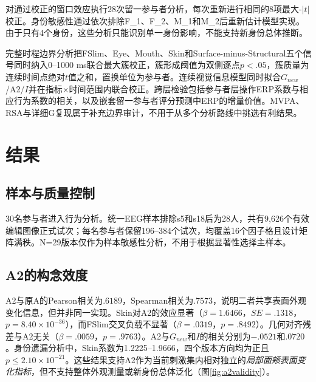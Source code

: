 \documentclass[preprint,12pt,authoryear]{elsarticle}
\begin{document}
对通过校正的窗口效应执行28次留一参与者分析，每次重新进行相同的8项最大-$|t|$校正。身份敏感性通过依次排除F\_1、F\_2、M\_1和M\_2后重新估计模型实现。由于只有4个身份，这些分析只能识别单一身份影响，不能支持新身份总体推断。

完整时程边界分析把FSlim、Eye、Mouth、Skin和Surface-minus-Structural五个信号同时纳入0--1000 ms联合最大簇校正，簇形成阈值为双侧逐点$p<.05$，簇质量为连续时间点绝对$t$值之和，置换单位为参与者。连续视觉信息模型同时拟合$G_{new}$/A2/$I$并在指标$\times$时间范围内联合校正。跨层检验包括参与者层操作ERP系数与相应行为系数的相关，以及嵌套留一参与者评分预测中ERP的增量价值\citep{MarisOostenveld2007}。MVPA、RSA与详细G复现属于补充边界审计，不用于从多个分析路线中挑选有利结果。

\section{结果}

\subsection{样本与质量控制}

30名参与者进入行为分析。统一EEG样本排除s5和s18后为28人，共有9,626个有效编辑图像正式试次；每名参与者保留196--384个试次，均覆盖16个因子格且设计矩阵满秩。N=29版本仅作为样本敏感性分析，不用于根据显著性选择主样本。

\subsection{A2的构念效度}

A2与原A的Pearson相关为$.6189$，Spearman相关为$.7573$，说明二者共享表面外观变化信息，但并非同一实现。Skin对A2的效应显著（$\beta=1.6466$，$SE=.1318$，$p=8.40\times10^{-36}$），而FSlim交叉负载不显著（$\beta=.0319$，$p=.8492$）。几何对齐残差与A2无关（$\beta=.0059$，$p=.9763$）。A2与$G_{new}$和$I$的相关分别为$-.0521$和$.0720$。身份遗漏分析中，Skin系数为1.2225--1.9666，四个版本方向均为正且$p\leq2.10\times10^{-21}$。这些结果支持A2作为当前刺激集内相对独立的\emph{局部面颊表面变化指标}，但不支持整体外观测量或新身份总体泛化（图\ref{fig:a2validity}）。
\end{document}
